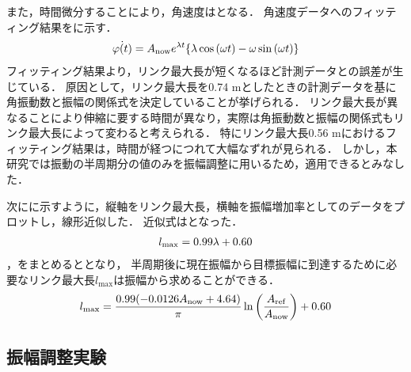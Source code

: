           また，時間微分することにより，角速度はとなる．
          角速度データへのフィッティング結果をに示す．
          \begin{eqnarray}
            \equlabel{Approximation Angular velocity}
            \dot{\varphi(t)}=A_{\mathrm{now}}e^{\lambda t}\{\lambda\cos{(\omega t)}-\omega\sin{(\omega t)}\}
          \end{eqnarray}
          \newpage
          フィッティング結果より，リンク最大長が短くなるほど計測データとの誤差が生じている．
          原因として，リンク最大長を0.74 mとしたときの計測データを基に角振動数と振幅の関係式を決定していることが挙げられる．
          リンク最大長が異なることにより伸縮に要する時間が異なり，実際は角振動数と振幅の関係式もリンク最大長によって変わると考えられる．
          特にリンク最大長0.56 mにおけるフィッティング結果は，時間が経つにつれて大幅なずれが見られる．
          しかし，本研究では振動の半周期分の値のみを振幅調整に用いるため，適用できるとみなした．

          次にに示すように，縦軸をリンク最大長，横軸を振幅増加率としてのデータをプロットし，線形近似した．
          近似式はとなった．
          \begin{eqnarray}
            \equlabel{length relation}
            l_{\mathrm{max}}=0.99\lambda+0.60
          \end{eqnarray}
          ，をまとめるととなり，
          半周期後に現在振幅から目標振幅に到達するために必要なリンク最大長$l_{\mathrm{max}}$は振幅から求めることができる．
          \begin{eqnarray}
            \equlabel{l status}
            l_{\mathrm{max}}=\frac{0.99(-0.0126A_{\mathrm{now}}+4.64)}{\pi}\ln{\left(\frac{A_{\mathrm{ref}}}{A_{\mathrm{now}}}\right)}+0.60
          \end{eqnarray}
          
        \subsection{振幅調整実験}
        
